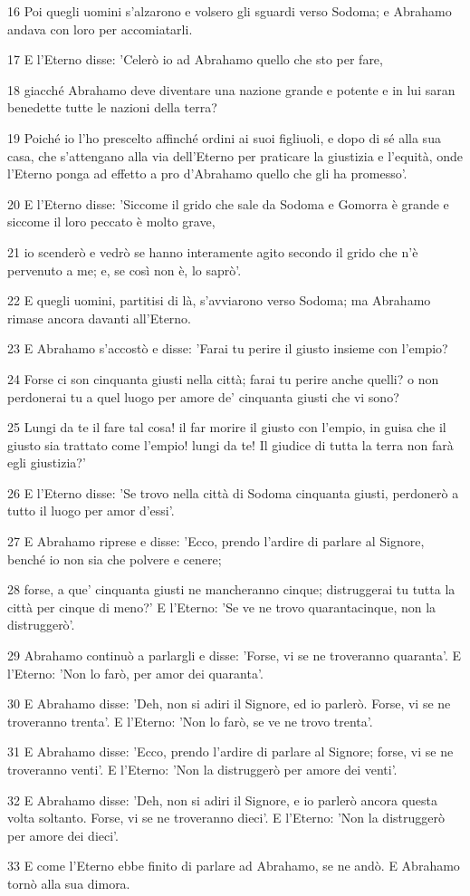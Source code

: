 \par 16 Poi quegli uomini s'alzarono e volsero gli sguardi verso Sodoma; e Abrahamo andava con loro per accomiatarli.
\par 17 E l'Eterno disse: 'Celerò io ad Abrahamo quello che sto per fare,
\par 18 giacché Abrahamo deve diventare una nazione grande e potente e in lui saran benedette tutte le nazioni della terra?
\par 19 Poiché io l'ho prescelto affinché ordini ai suoi figliuoli, e dopo di sé alla sua casa, che s'attengano alla via dell'Eterno per praticare la giustizia e l'equità, onde l'Eterno ponga ad effetto a pro d'Abrahamo quello che gli ha promesso'.
\par 20 E l'Eterno disse: 'Siccome il grido che sale da Sodoma e Gomorra è grande e siccome il loro peccato è molto grave,
\par 21 io scenderò e vedrò se hanno interamente agito secondo il grido che n'è pervenuto a me; e, se così non è, lo saprò'.
\par 22 E quegli uomini, partitisi di là, s'avviarono verso Sodoma; ma Abrahamo rimase ancora davanti all'Eterno.
\par 23 E Abrahamo s'accostò e disse: 'Farai tu perire il giusto insieme con l'empio?
\par 24 Forse ci son cinquanta giusti nella città; farai tu perire anche quelli? o non perdonerai tu a quel luogo per amore de' cinquanta giusti che vi sono?
\par 25 Lungi da te il fare tal cosa! il far morire il giusto con l'empio, in guisa che il giusto sia trattato come l'empio! lungi da te! Il giudice di tutta la terra non farà egli giustizia?'
\par 26 E l'Eterno disse: 'Se trovo nella città di Sodoma cinquanta giusti, perdonerò a tutto il luogo per amor d'essi'.
\par 27 E Abrahamo riprese e disse: 'Ecco, prendo l'ardire di parlare al Signore, benché io non sia che polvere e cenere;
\par 28 forse, a que' cinquanta giusti ne mancheranno cinque; distruggerai tu tutta la città per cinque di meno?' E l'Eterno: 'Se ve ne trovo quarantacinque, non la distruggerò'.
\par 29 Abrahamo continuò a parlargli e disse: 'Forse, vi se ne troveranno quaranta'. E l'Eterno: 'Non lo farò, per amor dei quaranta'.
\par 30 E Abrahamo disse: 'Deh, non si adiri il Signore, ed io parlerò. Forse, vi se ne troveranno trenta'. E l'Eterno: 'Non lo farò, se ve ne trovo trenta'.
\par 31 E Abrahamo disse: 'Ecco, prendo l'ardire di parlare al Signore; forse, vi se ne troveranno venti'. E l'Eterno: 'Non la distruggerò per amore dei venti'.
\par 32 E Abrahamo disse: 'Deh, non si adiri il Signore, e io parlerò ancora questa volta soltanto. Forse, vi se ne troveranno dieci'. E l'Eterno: 'Non la distruggerò per amore dei dieci'.
\par 33 E come l'Eterno ebbe finito di parlare ad Abrahamo, se ne andò. E Abrahamo tornò alla sua dimora.

